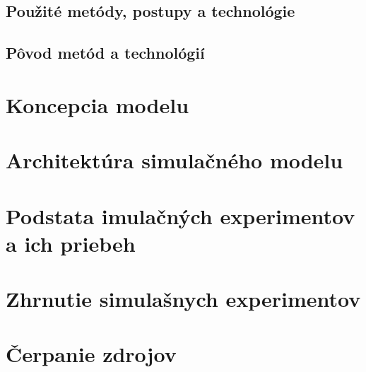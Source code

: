 \documentclass[a4paper, 10pt]{article}
\begin{document}
        \subsection{Použité metódy, postupy a technológie}

        \subsection{Pôvod metód a technológií}


    \section {Koncepcia modelu}


    \section{Architektúra simulačného modelu}

    \section{Podstata imulačných experimentov a ich priebeh}

    \section{Zhrnutie simulašnych experimentov}

    \section {Čerpanie zdrojov}
        {\cite{example}}

    \newpage
    
    
\end{document}
